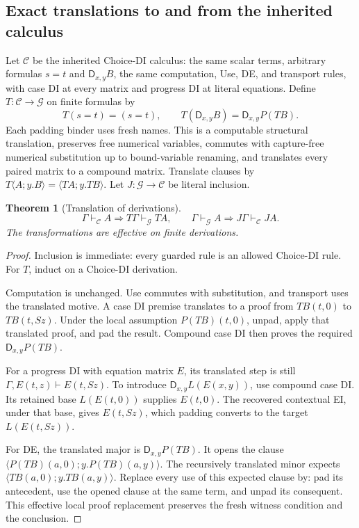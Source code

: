 \documentclass[11pt,letterpaper]{article}
\newtheorem{theorem}{Theorem}[section]
\theoremstyle{definition}
\begin{document}
\subsection{Exact translations to and from the inherited calculus}

Let $\mathcal C$ be the inherited Choice-DI calculus: the same scalar
terms, arbitrary formulas $s=t$ and $\mathsf D_{x,y}B$, the same
computation, Use, DE, and transport rules, with case DI at every matrix
and progress DI at literal equations.  Define $T:\mathcal C\to\mathcal G$
on finite formulas by
\[
 T(s=t)=(s=t),\qquad
 T(\mathsf D_{x,y}B)=\mathsf D_{x,y}P(TB).
\tag{Translation}\label{eq:guarded-translation}
\]
Each padding binder uses fresh names.  This is a computable structural
translation, preserves free numerical variables, commutes with
capture-free numerical substitution up to bound-variable renaming,
and translates every paired matrix to a compound matrix.
Translate clauses by
$T\langle A;y.B\rangle=\langle TA;y.TB\rangle$.
Let $J:\mathcal G\to\mathcal C$ be literal inclusion.

\begin{theorem}[Translation of derivations]
\[
 \Gamma\vdash_{\mathcal C}A\Longrightarrow
 T\Gamma\vdash_{\mathcal G}TA,
 \qquad
 \Gamma\vdash_{\mathcal G}A\Longrightarrow
 J\Gamma\vdash_{\mathcal C}JA.
\]
The transformations are effective on finite derivations.
\end{theorem}
\begin{proof}
Inclusion is immediate: every guarded rule is an allowed Choice-DI
rule.  For $T$, induct on a Choice-DI derivation.

Computation is unchanged.  Use commutes with substitution, and
transport uses the translated motive.  A case DI premise translates
to a proof from $TB(t,0)$ to $TB(t,Sz)$.  Under the local assumption
$P(TB)(t,0)$, unpad, apply that translated proof, and pad the result.
Compound case DI then proves the required
$\mathsf D_{x,y}P(TB)$.

For a progress DI with equation matrix $E$, its translated step is
still $\Gamma,E(t,z)\vdash E(t,Sz)$.  To introduce
$\mathsf D_{x,y}L(E(x,y))$, use compound case DI.  Its retained base
$L(E(t,0))$ supplies $E(t,0)$.  The recovered contextual EI, under
that base, gives $E(t,Sz)$, which padding converts to the target
$L(E(t,Sz))$.

For DE, the translated major is $\mathsf D_{x,y}P(TB)$.
It opens the clause
$\langle P(TB)(a,0);y.P(TB)(a,y)\rangle$.
The recursively translated minor expects
$\langle TB(a,0);y.TB(a,y)\rangle$.  Replace every use of this
expected clause by: pad its antecedent, use the opened clause at the
same term, and unpad its consequent.  This effective local proof
replacement preserves the fresh witness condition and the conclusion.
\end{proof}
\end{document}
